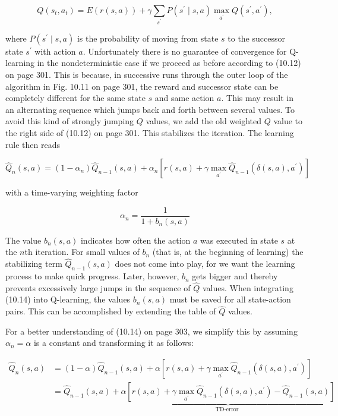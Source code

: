 \documentclass[10pt]{article}
\begin{document}
\begin{equation*}
Q\left(s_{t}, a_{t}\right)=E(r(s, a))+\gamma \sum_{s^{\prime}} P\left(s^{\prime} \mid s, a\right) \max _{a^{\prime}} Q\left(s^{\prime}, a^{\prime}\right), \tag{10.13}
\end{equation*}


where $P\left(s^{\prime} \mid s, a\right)$ is the probability of moving from state $s$ to the successor state $s^{\prime}$ with action $a$. Unfortunately there is no guarantee of convergence for Q-learning in the nondeterministic case if we proceed as before according to (10.12) on page 301. This is because, in successive runs through the outer loop of the algorithm in Fig. 10.11 on page 301, the reward and successor state can be completely different for the same state $s$ and same action $a$. This may result in an alternating sequence which jumps back and forth between several values. To avoid this kind of strongly jumping $Q$ values, we add the old weighted $Q$ value to the right side of (10.12) on page 301. This stabilizes the iteration. The learning rule then reads


\begin{equation*}
\hat{Q}_{n}(s, a)=\left(1-\alpha_{n}\right) \hat{Q}_{n-1}(s, a)+\alpha_{n}\left[r(s, a)+\gamma \max _{a^{\prime}} \hat{Q}_{n-1}\left(\delta(s, a), a^{\prime}\right)\right] \tag{10.14}
\end{equation*}


with a time-varying weighting factor

$$
\alpha_{n}=\frac{1}{1+b_{n}(s, a)}
$$

The value $b_{n}(s, a)$ indicates how often the action $a$ was executed in state $s$ at the $n$th iteration. For small values of $b_{n}$ (that is, at the beginning of learning) the stabilizing term $\hat{Q}_{n-1}(s, a)$ does not come into play, for we want the learning process to make quick progress. Later, however, $b_{n}$ gets bigger and thereby prevents excessively large jumps in the sequence of $\hat{Q}$ values. When integrating (10.14) into Q-learning, the values $b_{n}(s, a)$ must be saved for all state-action pairs. This can be accomplished by extending the table of $\hat{Q}$ values.

For a better understanding of (10.14) on page 303, we simplify this by assuming $\alpha_{n}=\alpha$ is a constant and transforming it as follows:

$$
\begin{aligned}
\hat{Q}_{n}(s, a) & =(1-\alpha) \hat{Q}_{n-1}(s, a)+\alpha\left[r(s, a)+\gamma \max _{a^{\prime}} \hat{Q}_{n-1}\left(\delta(s, a), a^{\prime}\right)\right] \\
& =\hat{Q}_{n-1}(s, a)+\underbrace{\alpha\left[r(s, a)+\gamma \max _{a^{\prime}} \hat{Q}_{n-1}\left(\delta(s, a), a^{\prime}\right)-\hat{Q}_{n-1}(s, a)\right]}_{\text {TD-error }}
\end{aligned}
$$
\end{document}
